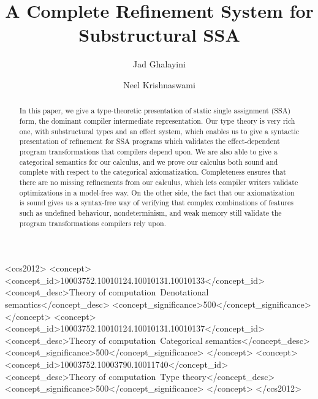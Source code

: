 \documentclass[acmsmall,screen,anonymous,review]{acmart}
\begin{document}
\title{A Complete Refinement System for Substructural SSA}

\author{Jad Ghalayini}

\author{Neel Krishnaswami}

\begin{abstract}
  In this paper, we give a type-theoretic presentation of static single assignment (SSA) form, the
  dominant compiler intermediate representation. Our type theory is very rich one, with
  substructural types and an effect system, which enables us to give a syntactic presentation of
  refinement for SSA programs which validates the effect-dependent program transformations that
  compilers depend upon. We are also able to give a categorical semantics for our calculus, and we
  prove our calculus both sound and complete with respect to the categorical axiomatization.
  Completeness ensures that there are no missing refinements from our calculus, which lets compiler
  writers validate optimizations in a model-free way. On the other side, the fact that our
  axiomatization is sound gives us a syntax-free way of verifying that complex combinations of
  features such as undefined behaviour, nondeterminism, and weak memory still validate the program
  transformations compilers rely upon. 
\end{abstract}

\begin{CCSXML}
  <ccs2012>
  <concept>
  <concept_id>10003752.10010124.10010131.10010133</concept_id>
  <concept_desc>Theory of computation~Denotational semantics</concept_desc>
  <concept_significance>500</concept_significance>
  </concept>
  <concept>
  <concept_id>10003752.10010124.10010131.10010137</concept_id>
  <concept_desc>Theory of computation~Categorical semantics</concept_desc>
  <concept_significance>500</concept_significance>
  </concept>
  <concept>
  <concept_id>10003752.10003790.10011740</concept_id>
  <concept_desc>Theory of computation~Type theory</concept_desc>
  <concept_significance>500</concept_significance>
  </concept>
  </ccs2012>
\end{CCSXML}


\end{document}
